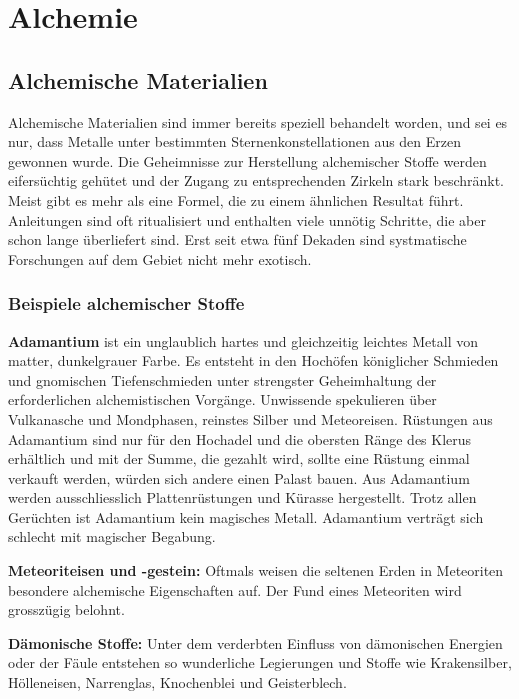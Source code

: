 \documentclass[10pt,twoside,twocolumn,openany]{book}
\begin{document}
\newpage \section{Alchemie}
\begin{multicols}{2}

	
	\subsection*{Alchemische Materialien}
	Alchemische Materialien sind immer bereits speziell behandelt worden, und sei es nur, dass Metalle unter bestimmten Sternenkonstellationen aus den Erzen gewonnen wurde. Die Geheimnisse zur Herstellung alchemischer Stoffe werden eifersüchtig gehütet und der Zugang zu entsprechenden Zirkeln stark beschränkt. Meist gibt es mehr als eine Formel, die zu einem ähnlichen Resultat führt. Anleitungen sind oft ritualisiert und enthalten viele unnötig Schritte, die aber schon lange überliefert sind. Erst seit etwa fünf Dekaden sind systmatische Forschungen auf dem Gebiet nicht mehr exotisch.
	
	\subsubsection{Beispiele alchemischer Stoffe}
	\textbf{Adamantium} ist ein unglaublich hartes und gleichzeitig leichtes Metall von matter, dunkelgrauer Farbe. Es entsteht in den Hochöfen königlicher Schmieden und gnomischen Tiefenschmieden unter strengster Geheimhaltung der erforderlichen alchemistischen Vorgänge.
	Unwissende spekulieren über Vulkanasche und Mondphasen, reinstes Silber und Meteoreisen. Rüstungen aus Adamantium sind nur für den Hochadel und die obersten Ränge des Klerus erhältlich und mit der Summe, die gezahlt wird, sollte eine Rüstung einmal verkauft werden, würden sich andere einen Palast bauen. Aus Adamantium werden ausschliesslich Plattenrüstungen und Kürasse hergestellt.
	Trotz allen Gerüchten ist Adamantium kein magisches Metall. Adamantium verträgt sich schlecht mit magischer Begabung.
	
	\textbf{Meteoriteisen und -gestein:} Oftmals weisen die seltenen Erden in Meteoriten besondere alchemische Eigenschaften auf. Der Fund eines Meteoriten wird grosszügig belohnt.
	
	\textbf{Dämonische Stoffe:} Unter dem verderbten Einfluss von dämonischen Energien oder der Fäule entstehen so wunderliche Legierungen und Stoffe wie Krakensilber, Hölleneisen, Narrenglas, Knochenblei und Geisterblech.
	

\end{multicols}
\end{document}
